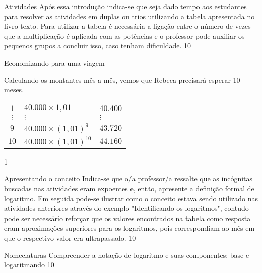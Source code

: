 \begin{sugestions}{Atividades}
{
	Após essa introdução indica-se que seja dado tempo aos estudantes para resolver as atividades em duplas ou trios utilizando a tabela apresentada no livro texto. Para utilizar a tabela é necessária a ligação entre o número de vezes que a multiplicação é aplicada com as potências e o professor pode auxiliar os pequenos grupos a concluir isso, caso tenham dificuldade.
}
{1}{0}
\end{sugestions}
\begin{answer}{Economizando para uma viagem}
{
	Calculando os montantes mês a mês, vemos que Rebeca precisará esperar 10 meses.
	\begin{table}[H]
	\centering

	\begin{tabular}{|c|l|l|}
	\hline
	\tcolor{$0$} & \tcolor{$40.000$} & \tcolor{$40.000$} \\
	\hline
	$1$ & $40.000\times1{,}01$ & $40.400$ \\
	\hline
	$\vdots$ & $\vdots$ & $\vdots$ \\
	\hline
	$9$ & $40.000\times(1{,}01)^9$ & $43.720$ \\
	\hline
	$10$ & $40.000\times(1{,}01)^{10}$ & $44.160$ \\
	\hline
	\end{tabular}
	\end{table}
	}{1}
\end{answer}
\def\currentcolor{session4}
\begin{sugestions}{Apresentando o conceito}
{
	Indica-se que o/a professor/a ressalte que as incógnitas buscadas nas atividades eram expoentes e, então, apresente a definição formal de logaritmo. Em seguida pode-se ilustrar como o conceito estava sendo utilizado nas atividades anteriores através do exemplo "Identificando os logaritmos", contudo pode ser necessário reforçar que os valores encontrados na tabela como resposta eram aproximações superiores para os logaritmos, pois correspondiam ao mês em que o respectivo valor era ultrapassado.
}{1}{0}
\end{sugestions}
\begin{objectives}{Nomeclaturas}
{
Compreender a notação de logaritmo e suas componentes: base e logaritmando}
{1}{0}
\end{objectives}
\clearmargin



